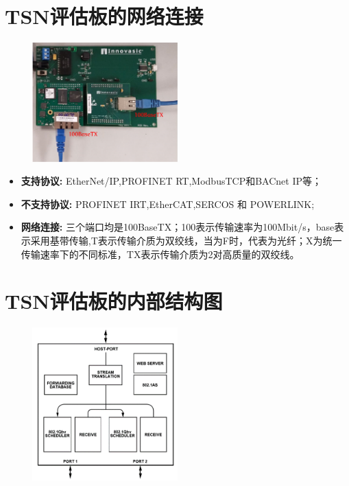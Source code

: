 \section{TSN评估板的网络连接}

\begin{figure}[h]
    \centering
    \label{structure2}
    \includegraphics[width=0.5\textwidth]{pic/connection.png}
    \caption{}
\end{figure}

\begin{itemize}
	\item \textbf{支持协议:} EtherNet/IP,PROFINET RT,ModbusTCP和BACnet IP等；
	\item \textbf{不支持协议:} PROFINET IRT,EtherCAT,SERCOS 和 POWERLINK;
	\item \textbf{网络连接:} 三个端口均是100BaseTX；100表示传输速率为100Mbit/s，base表示采用基带传输,T表示传输介质为双绞线，当为F时，代表为光纤；X为统一传输速率下的不同标准，TX表示传输介质为2对高质量的双绞线。
\end{itemize}

\section{TSN评估板的内部结构图}
\begin{figure}[h]
	\centering
	\label{structure3}
	\includegraphics[width=0.5\textwidth]{pic/instructure.png}
	\caption{}
\end{figure}

